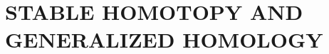 \documentclass[../main]{subfiles}
\begin{document}
\part{STABLE HOMOTOPY AND GENERALIZED HOMOLOGY}
\begin{refsection}















%


\printbibliography
\end{refsection}
\end{document}

